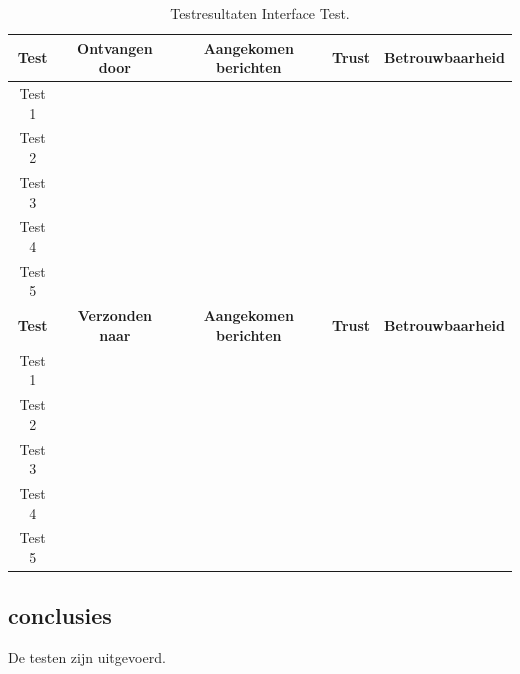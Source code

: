 \begin{table}[h]
    \centering
    \begin{tabular}{|c||c|c|c|c|}
        \hline
        \textbf{Test}   &   \textbf{Ontvangen door} & \textbf{Aangekomen berichten} &   \textbf{Trust}  &   \textbf{Betrouwbaarheid}    \\\hline
        Test 1          &                           &                               &                   &                               \\\hline 
        Test 2          &                           &                               &                   &                               \\\hline 
        Test 3          &                           &                               &                   &                               \\\hline 
        Test 4          &                           &                               &                   &                               \\\hline 
        Test 5          &                           &                               &                   &                               \\\hline 
        \textbf{Test}   &   \textbf{Verzonden naar} & \textbf{Aangekomen berichten} &   \textbf{Trust}  &   \textbf{Betrouwbaarheid}    \\\hline
        Test 1          &                           &                               &                   &                               \\\hline 
        Test 2          &                           &                               &                   &                               \\\hline 
        Test 3          &                           &                               &                   &                               \\\hline 
        Test 4          &                           &                               &                   &                               \\\hline 
        Test 5          &                           &                               &                   &                               \\\hline 
    \end{tabular}
    \caption{Testresultaten Interface Test.}
    \label{tab:Int}
\end{table}

\subsection{conclusies}
De testen zijn uitgevoerd. 

